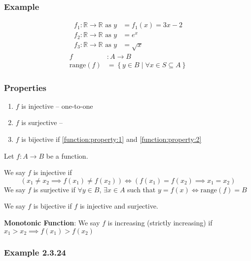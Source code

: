 \documentclass{article}
\begin{document}
\subsubsection{Example}

\begin{align*}
	f_1 : \mathbb{R} \rightarrow \mathbb{R} \text{ as } y & = f_1(x) = 3x - 2 \\
	f_2 : \mathbb{R} \rightarrow \mathbb{R} \text{ as } y & = e^{x}           \\
	f_3 : \mathbb{R} \rightarrow \mathbb{R} \text{ as } y & = \sqrt{x}
\end{align*}
\begin{align*}
	f               & : A \rightarrow B                                           \\
	\text{range}(f) & = \left\{ y \in B \mid \forall x \in S \subseteq A \right\}
\end{align*}

\subsubsection{Properties}

\begin{enumerate}[label = \textbf{\arabic*)}]
	\item \label{function:property:1} $ f $ is injective – one-to-one \\
	\item \label{function:property:2} $ f $ is surjective – \\
	\item $ f $ is bijective if \ref{function:property:1} and \ref{function:property:2}
\end{enumerate}

Let $ f : A \rightarrow B $ be a function.

We say $ f $ is injective if
\begin{equation*}
	\left( x_1 \neq x_2 \implies f(x_1) \neq f(x_2) \right) \iff \left( f(x_1) = f(x_2) \implies x_1 = x_2 \right)
\end{equation*}
We say $ f $ is surjective if $ \forall y \in B $, $ \exists x \in A $ such that $ y = f(x) \iff \text{range}(f) = B $

We say $ f $ is bijective if $ f $ is injective and surjective.

\textbf{Monotonic Function}: We say $ f $ is increasing (strictly increasing) if $ x_1 > x_2 \implies f(x_1) > f(x_2) $

\subsubsection{Example 2.3.24}
\end{document}
